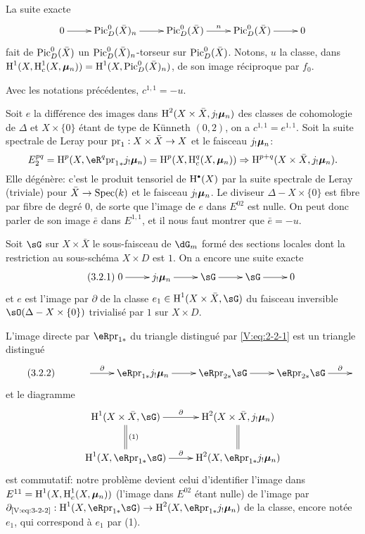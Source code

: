 La suite exacte 
\[\xymatrix{
  0 \ar[r] 
    & \pic_D^0(\bar X)_n \ar[r] 
    & \pic_D^0(\bar X) \ar[r]^n 
    & \pic_D^0(\bar X) \ar[r] 
    & 0 
}\]
fait de $\operatorname{Pic}_D^0(\bar X)$ un $\operatorname{Pic}_D^0(\bar X)_n$-torseur sur 
$\operatorname{Pic}_D^0(\bar X)$. Notons, $u$ la classe, dans 
$\operatorname{H}^1(X,\operatorname{H}_c^1(X,{\bm\mu}_n))=\operatorname{H}^1(X,\operatorname{Pic}_D^0(\bar X)_n)$, de son image 
réciproque par $f_0$. 





\begin{proposition_}\label{V:3-2}
Avec les notations précédentes, $c^{1,1}=-u$.
\end{proposition_}

Soit $e$ la différence des images dans $\operatorname{H}^2(X\times \bar X,j_!{\bm\mu}_n)$ des 
classes de cohomologie de $\Delta$ et $X\times\{0\}$ étant de type de 
K\"unneth $(0,2)$, on a $c^{1,1}=e^{1,1}$. Soit la suite spectrale de Leray 
pour $\mathrm{pr}_1:X\times \bar X\to X$ et le faisceau $j_!{\bm\mu}_n$: 
\[
  E_2^{pq} = \h^p(X,\eR^q {\pr_1}_\ast j_!\dmu_n) = \h^p(X,\h_c^q(X,\dmu_n)) \Rightarrow \h^{p+q}(X\times \bar X,j_!\dmu_n) \text{.}
\]
Elle dégénère: c'est le produit tensoriel de $\h^\bullet(X)$ par la 
suite spectrale de Leray (triviale) pour $\bar X\to \operatorname{Spec}(k)$ et le faisceau 
$j_!{\bm\mu}_n$. Le diviseur $\Delta-X\times\{0\}$ est fibre par fibre de degré 
$0$, de sorte que l'image de $e$ dans $E^{02}$ est nulle. On peut donc parler 
de son image $\bar e$ dans $E^{1,1}$, et il nous faut montrer que 
$\bar e = -u$. 

Soit $\sG$ sur $X\times\bar X$ le sous-faisceau de $\dG_m$ formé des sections 
locales dont la restriction au sous-schéma $X\times D$ est $1$. On a encore 
une suite exacte 
\begin{equation*}\tag{3.2.1}\label{V:eq:3-2-1}
\xymatrix{
  0 \ar[r] 
    & j_!\dmu_n \ar[r] 
    & \sG \ar[r] 
    & \sG \ar[r] 
    & 0 
}
\end{equation*}
et $e$ est l'image par $\partial$ de la classe $e_1\in \h^1(X\times\bar X,\sG)$ 
du faisceau inversible $\sO(\Delta-X\times\{0\})$ trivialisé par $1$ sur 
$X\times D$. 

L'image directe par $\eR\pr_{1\ast}$ du triangle distingué par 
\eqref{V:eq:2-2-1} est un triangle distingué 
\begin{equation*}\tag{3.2.2}\label{V:eq:3-2-2}
\xymatrix{
  & \ar[r]^-\partial 
    & \eR \pr_{1\ast} j_!\dmu_n \ar[r] 
    & \eR \pr_{2\ast}\sG \ar[r] 
    & \eR \pr_{2\ast}\sG \ar[r]^-\partial 
    & 
}
\end{equation*}
et le diagramme 
\[\xymatrix{
  \h^1(X\times \bar X,\sG) \ar[r]^-\partial \ar@{=}[d]^-{(1)} 
    & \h^2(X\times \bar X,j_!\dmu_n) \ar@{=}[d] \\
  \h^1(X,\eR\pr_{1\ast} \sG) \ar[r]^-\partial 
    & \h^2(X,\eR\pr_{1\ast} j_!\dmu_n) 
}\]
est commutatif: notre problème devient celui d'identifier l'image dans 
$E^{11}=\operatorname{H}^1(X,\operatorname{H}_c^1(X,{\bm\mu}_n))$ (l'image dans $E^{02}$ étant nulle) de 
l'image par 
$\partial_{\text{\eqref{V:eq:3-2-2}}}:\h^1(X,\eR\pr_{1\ast}\sG) \to \h^2(X,\eR\pr_{1\ast} j_!\dmu_n)$ 
de la classe, encore notée $e_1$, qui correspond à $e_1$ par 
(1). 

